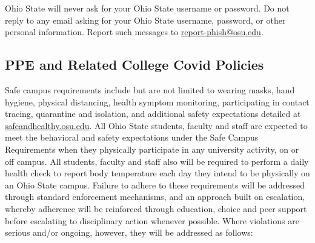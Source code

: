 \documentclass[12pt,letter,english]{report}
\begin{document}
Ohio State will never ask for your Ohio State username or password. Do not reply to any email asking for your Ohio State username, password, or other personal information. Report such messages to \href{about:blank}{report-phish@osu.edu}.

\subsection{PPE and Related College Covid Policies}

Safe campus requirements include but are not limited to wearing masks, hand hygiene, physical distancing, health symptom monitoring, participating in contact tracing, quarantine and isolation, and additional safety expectations detailed at \href{safeandhealthy.osu.edu}{safeandhealthy.osu.edu}. All Ohio State students, faculty and staff are expected to meet the behavioral and safety expectations under the Safe Campus Requirements when they physically participate in any university activity, on or off campus. All students, faculty and staff also will be required to perform a daily health check to report body temperature each day they intend to be physically on an Ohio State campus. Failure to adhere to these requirements will be addressed through standard enforcement mechanisms, and an approach built on escalation, whereby adherence will be reinforced through education, choice and peer support before escalating to disciplinary action whenever possible. Where violations are serious and/or ongoing, however, they will be addressed as follows:
\end{document}
